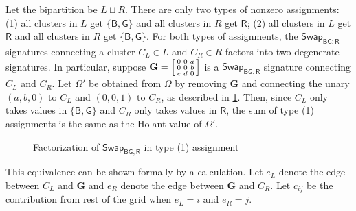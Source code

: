 \documentclass[11pt]{article}
\newcommand{\db}{\mathsf{B}}
\newcommand{\dg}{\mathsf{G}}
\newcommand{\dr}{\mathsf{R}}
\newcommand{\swhelper}[1]{$\mathsf{Swap}_{#1}$\xspace}
\newcommand{\swbg}{\swhelper{\db \dg; \dr}}
\begin{document}
Let the bipartition be $L \sqcup R$.
There are only two types of nonzero assignments: 
(1) all clusters in $L$ get $\{\db, \dg\}$ and all clusters in $R$ get $\dr$;
(2) all clusters in $L$ get $\dr$ and all clusters in $R$ get $\{\db, \dg\}$.
For both types of assignments, the \swbg signatures connecting a cluster $C_L \in L$ and $C_R \in R$ factors into two degenerate signatures.
In particular, suppose $\mathbf{G} = \begin{bsmallmatrix}
  0 & 0 & a \\
  0 & 0 & b \\
  c & d & 0
\end{bsmallmatrix}$ is a \swbg signature connecting $C_L$ and $C_R$.
Let $\Omega'$ be obtained from $\Omega$ by removing $\mathbf{G}$ and connecting the unary $(a, b, 0)$ to $C_L$ and $(0, 0, 1)$ to $C_R$, as described in \cref{fig:swap-factor}.
Then, since $C_L$ only takes values in $\{\db, \dg\}$ and $C_R$ only takes values in $\dr$, 
the sum of type (1) assignments is the same as the Holant value of $\Omega'$.
\begin{figure}
  \centering
  \caption{Factorization of \swbg in type (1) assignment}\label{fig:swap-factor}
\end{figure}
This equivalence can be shown formally by a calculation. 
Let $e_L$ denote the edge between $C_L$ and $\mathbf{G}$ and $e_R$ denote the edge between $\mathbf{G}$ and $C_R$.
Let $c_{ij}$ be the contribution from rest of the grid when $e_L = i$ and $e_R = j$.
\end{document}
